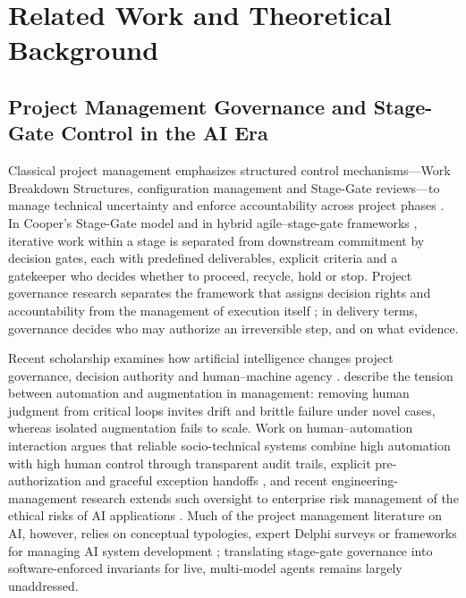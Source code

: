 \documentclass[11pt,a4paper]{article}
\theoremstyle{definition}
\begin{document}
\section{Related Work and Theoretical Background}
\label{sec:2}

\subsection{Project Management Governance and Stage-Gate Control in the AI Era}
\label{sec:2.1}

Classical project management emphasizes structured control mechanisms---Work Breakdown Structures, configuration management and Stage-Gate reviews---to manage technical uncertainty and enforce accountability across project phases \citep{Cooper1990, Whyte2016, PMI2021, Kerzner2022}. In Cooper's Stage-Gate model and in hybrid agile--stage-gate frameworks \citep{Conforto2016, Bianchi2022}, iterative work within a stage is separated from downstream commitment by decision gates, each with predefined deliverables, explicit criteria and a gatekeeper who decides whether to proceed, recycle, hold or stop. Project governance research separates the framework that assigns decision rights and accountability from the management of execution itself \citep{Too2014, Bakhshi2026}; in delivery terms, governance decides who may authorize an irreversible step, and on what evidence.

Recent scholarship examines how artificial intelligence changes project governance, decision authority and human--machine agency \citep{Holzmann2022, Muller2024, Dacre2026, Papadonikolaki2026}. \citet{Raisch2021} describe the tension between automation and augmentation in management: removing human judgment from critical loops invites drift and brittle failure under novel cases, whereas isolated augmentation fails to scale. Work on human--automation interaction argues that reliable socio-technical systems combine high automation with high human control through transparent audit trails, explicit pre-authorization and graceful exception handoffs \citep{Parasuraman2000, Amershi2019, Shneiderman2020}, and recent engineering-management research extends such oversight to enterprise risk management of the ethical risks of AI applications \citep{McGrath2025}. Much of the project management literature on AI, however, relies on conceptual typologies, expert Delphi surveys or frameworks for managing AI system development \citep{Holzmann2022, Shin2026}; translating stage-gate governance into software-enforced invariants for live, multi-model agents remains largely unaddressed.
\end{document}
